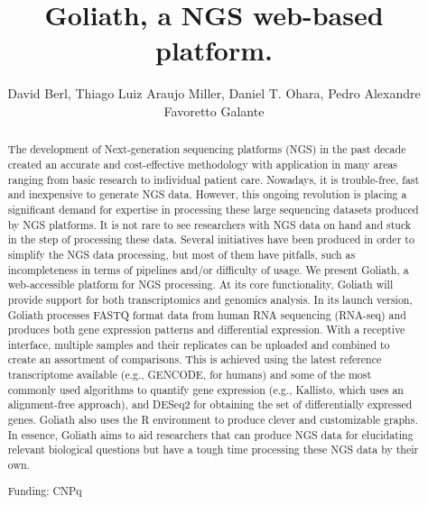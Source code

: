 \documentclass[twoside]{article}
\title{\vspace{-15mm}\fontsize{24pt}{10pt}\selectfont\textbf{ Goliath,  a NGS web-based platform. }} %
\author{ David Berl, Thiago Luiz Araujo Miller, Daniel T. Ohara, Pedro Alexandre Favoretto Galante }
\affil{ USP }
\date{}
\begin{document}
  
  
  \maketitle %
  
  
  \thispagestyle{fancy} %
  
  
  \begin{abstract}
  The development of Next-generation sequencing platforms (NGS) in the past decade created an accurate and cost-effective methodology with application in many areas ranging from basic research to individual patient care. Nowadays,  it is trouble-free,  fast and inexpensive to generate NGS data. However,  this ongoing revolution is placing a significant demand for expertise in processing these large sequencing datasets produced by NGS platforms. It is not rare to see researchers with NGS data on hand and stuck in the step of processing these data. Several initiatives have been produced in order to simplify the NGS data processing,  but most of them have pitfalls,  such as incompleteness in terms of pipelines and/or difficulty of usage. We present Goliath,  a  web-accessible platform for NGS processing.  At its core functionality,  Goliath will provide support for both transcriptomics and genomics analysis. In its launch version,  Goliath processes FASTQ format data from human RNA sequencing (RNA-seq) and produces both gene expression patterns and differential expression. With a receptive interface,  multiple samples and their replicates can be uploaded and combined to create an assortment of comparisons. This is achieved using the latest reference transcriptome available (e.g.,  GENCODE,  for humans) and some of the most commonly used algorithms to quantify gene expression (e.g.,  Kallisto,  which uses an alignment-free approach),  and DESeq2 for obtaining the set of differentially expressed genes. Goliath also uses the R environment to produce clever and customizable  graphs. In essence,  Goliath aims to aid researchers that can produce NGS data for elucidating relevant biological questions  but have a tough time processing these NGS data by their own.
  
  Funding: CNPq \\ 
  \end{abstract}
  
\end{document}
